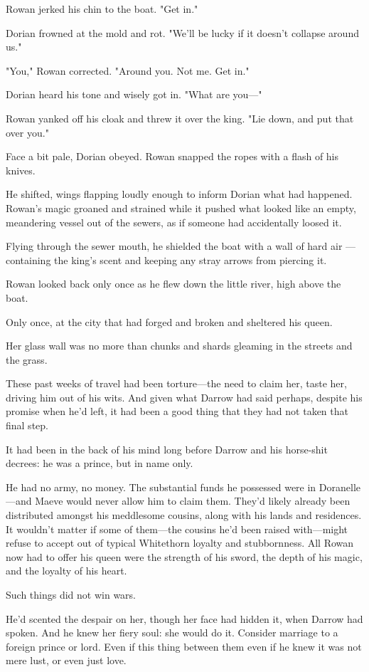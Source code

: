 Rowan jerked his chin to the boat.
"Get in."

Dorian frowned at the mold and rot.
"We'll be lucky if it doesn't collapse around us."

"You," Rowan corrected.
"Around you.
Not me.
Get in."

Dorian heard his tone and wisely got in.
"What are you---"

Rowan yanked off his cloak and threw it over the king.
"Lie down, and put that over you."

Face a bit pale, Dorian obeyed.
Rowan snapped the ropes with a flash of his knives.

He shifted, wings flapping loudly enough to inform Dorian what had happened.
Rowan's magic groaned and strained while it pushed what looked like an empty, meandering vessel out of the sewers, as if someone had accidentally loosed it.

Flying through the sewer mouth, he shielded the boat with a wall of hard air ---containing the king's scent and keeping any stray arrows from piercing it.

Rowan looked back only once as he flew down the little river, high above the boat.

Only once, at the city that had forged and broken and sheltered his queen.

Her glass wall was no more than chunks and shards gleaming in the streets and the grass.

These past weeks of travel had been torture---the need to claim her, taste her, driving him out of his wits.
And given what Darrow had said  perhaps, despite his promise when he'd left, it had been a good thing that they had not taken that final step.

It had been in the back of his mind long before Darrow and his horse-shit decrees: he was a prince, but in name only.

He had no army, no money.
The substantial funds he possessed were in Doranelle---and Maeve would never allow him to claim them.
They'd likely already been distributed amongst his meddlesome cousins, along with his lands and residences.
It wouldn't matter if some of them---the cousins he'd been raised with---might refuse to accept out of typical Whitethorn loyalty and stubbornness.
All Rowan now had to offer his queen were the strength of his sword, the depth of his magic, and the loyalty of his heart.

Such things did not win wars.

He'd scented the despair on her, though her face had hidden it, when Darrow had spoken.
And he knew her fiery soul: she would do it.
Consider marriage to a foreign prince or lord.
Even if this thing between them  even if he knew it was not mere lust, or even just love.

